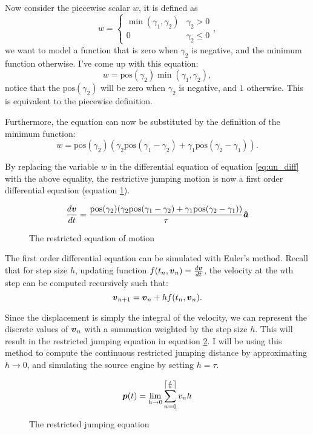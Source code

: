 Now consider the piecewise scalar $w$, it is defined as
\[
    w = \begin{cases}
        \min(\gamma_1, \gamma_2) & \gamma_2 > 0\\
        0 & \gamma_2 \le 0
    \end{cases},
\]
we want to model a function that is zero when $\gamma_2$ is negative, and the minimum function otherwise. I've come up with this equation:
\[
    w = \text{pos}(\gamma_2)\min(\gamma_1, \gamma_2),
\]
notice that the $\text{pos}(\gamma_2)$ will be zero when $\gamma_2$ is negative, and $1$ otherwise. This is equivalent to the piecewise definition.

Furthermore, the equation can now be substituted by the definition of the minimum function:
\[
    w = \text{pos}(\gamma_2)(\gamma_2 \text{pos}(\gamma_1 - \gamma_2) + \gamma_1 \text{pos}(\gamma_2 - \gamma_1)).
\]

By replacing the variable $w$ in the differential equation of equation \ref{eq:un_diff} with the above equality, the restrictive jumping motion is now a first order differential equation (equation \ref{eq:reom}).

\begin{figure}[H]
    \centering
    \[
        \frac{d\tv}{dt} = \frac{\text{pos}(\gamma_2) (\gamma_2\text{pos}(\gamma_1 - \gamma_2) + \gamma_1 \text{pos}(\gamma_2 - \gamma_1))}{\tau} \tunit{a}
    \]
    \caption{The restricted equation of motion}
    \label{eq:reom}
\end{figure}

The first order differential equation can be simulated with Euler's method. Recall that for step size $h$, updating function $f(t_n, \tv_n) = \frac{d\tv}{dt}$, the velocity at the $n$th step can be computed recursively such that:
\[
    \tv_{n+1} = \tv_{n} + h f(t_n, \tv_n).
\]

Since the displacement is simply the integral of the velocity, we can represent the discrete values of $\tv_{n}$ with a summation weighted by the step size $h$. This will result in the restricted jumping equation in equation \ref{eq:rje}. I will be using this method to compute the continuous restricted jumping distance by approximating $h \to 0$, and simulating the source engine by setting $h = \tau$.

\begin{figure}[H]
    \centering
    \[
        \tp(t) = \lim_{h \to 0} \sum_{n=0}^{\ceil*{\frac{t}{h}}} v_{n} h
    \]
    \caption{The restricted jumping equation}
    \label{eq:rje}
\end{figure}


